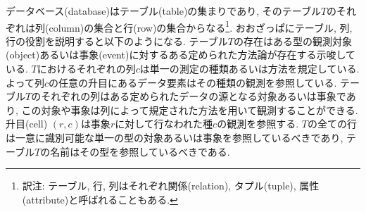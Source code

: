 データベース(database)はテーブル(table)の集まりであり, そのテーブル$T$のそれぞれは列(column)の集合と行(row)の集合からなる\footnote{訳注: テーブル, 行, 列はそれぞれ関係(relation), タプル(tuple), 属性(attribute)と呼ばれることもある.}. おおざっぱにテーブル, 列, 行の役割を説明すると以下のようになる. テーブル$T$の存在はある型の観測対象(object)あるいは事象(event)に対するある定められた方法論が存在する示唆している. $T$におけるそれぞれの列$c$は単一の測定の種類あるいは方法を規定している. よって列$c$の任意の升目にあるデータ要素はその種類の観測を参照している. テーブル$T$のそれぞれの列はある定められたデータの源となる対象あるいは事象であり, この対象や事象は列によって規定された方法を用いて観測することができる. 升目(cell) $(r,c)$は事象$r$に対して行なわれた種$c$の観測を参照する. $T$の全ての行は一意に識別可能な単一の型の対象あるいは事象を参照しているべきであり, テーブル$T$の名前はその型を参照しているべきである. 


